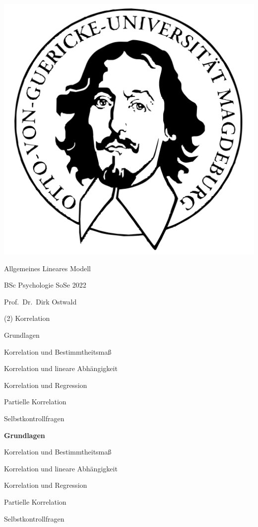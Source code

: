 \documentclass[
  8pt,
  ignorenonframetext,
]{beamer}
\author{}
\date{\vspace{-2.5em}}
\begin{document}
\begin{frame}[plain]{}
\protect\hypertarget{section}{}
\center

\begin{center}\includegraphics[width=0.2\linewidth]{2_Abbildungen/alm_2_otto} \end{center}

\vspace{2mm}

\huge

Allgemeines Lineares Modell \vspace{6mm}

\large

BSc Psychologie SoSe 2022

\vspace{6mm}
\normalsize

Prof.~Dr.~Dirk Ostwald
\end{frame}

\begin{frame}[plain]{}
\protect\hypertarget{section-1}{}
\center
\huge
\vfill

\noindent (2) Korrelation \vfill
\end{frame}

\begin{frame}{}
\protect\hypertarget{section-2}{}
\vfill
\large

Grundlagen

Korrelation und Bestimmtheitsmaß

Korrelation und lineare Abhängigkeit

Korrelation und Regression

Partielle Korrelation

Selbstkontrollfragen

\vfill
\end{frame}

\begin{frame}{}
\protect\hypertarget{section-3}{}
\vfill
\large

\textbf{Grundlagen}

Korrelation und Bestimmtheitsmaß

Korrelation und lineare Abhängigkeit

Korrelation und Regression

Partielle Korrelation

Selbstkontrollfragen

\vfill
\end{frame}
\end{document}
